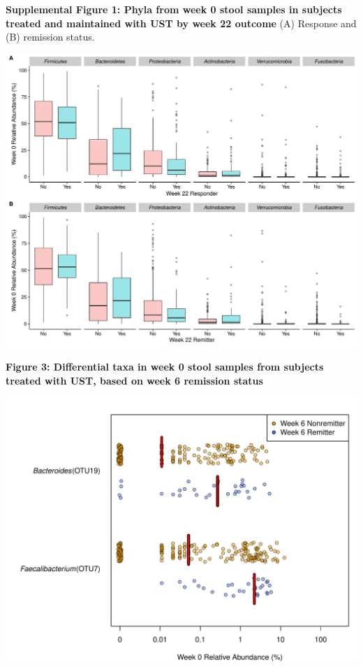 \documentclass[11pt,]{article}
\begin{document}
\newpage

\textbf{Supplemental Figure 1: Phyla from week 0 stool samples in
subjects treated and maintained with UST by week 22 outcome} (A)
Response and (B) remission status.

\includegraphics{figures/SF1_phylaWK22.pdf}

\newpage

\textbf{Figure 3: Differential taxa in week 0 stool samples from
subjects treated with UST, based on week 6 remission status}

\includegraphics{figures/Figure3_basesigOTUabund.REMISSwk6.pdf}
\end{document}
